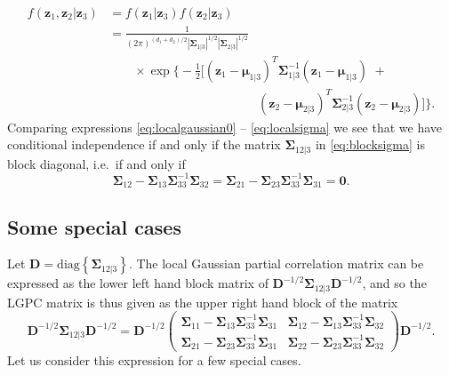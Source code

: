 \documentclass[
  12pt,
  letterpaper]{article}
\numberwithin{equation}{section}
\newcommand{\z}{\bm{z}}
\newcommand{\D}{\bm{D}}
\newcommand{\fmu}{\bm{\mu}}
\newcommand{\fSigma}{\bm{\Sigma}}
\begin{document}
\begin{align*}
f(\z_1, \z_2|\z_3) &= f(\z_1|\z_3)f(\z_2|\z_3) \\
&= \frac{1}{(2\pi)^{(d_1+d_2)/2}|\fSigma_{1|3}|^{1/2}|\fSigma_{2|3}|^{1/2}} \\
& \qquad \times \exp \Big\{-\frac{1}{2}\big[(\z_1 - \fmu_{1|3})^T\fSigma_{1|3}^{-1}(\z_1 - \fmu_{1|3}) \,\, + \\
& \qquad\qquad\qquad\qquad\qquad\qquad(\z_2 - \fmu_{2|3})^T\fSigma_{2|3}^{-1}(\z_2 - \fmu_{2|3})\big]\Big\}.
\end{align*}
Comparing expressions \eqref{eq:localgaussian0} -- \eqref{eq:localsigma} we see that we have conditional independence if and only if the matrix \(\fSigma_{12|3}\) in \eqref{eq:blocksigma} is block diagonal, i.e.~if and only if
\[\fSigma_{12} - \fSigma_{13}\fSigma_{33}^{-1} \fSigma_{32} = \fSigma_{21} - \fSigma_{23}\fSigma_{33}^{-1} \fSigma_{31} = \bm{0}.\]

\hypertarget{special-cases}{%
\subsection{Some special cases}\label{special-cases}}

Let \(\D = \textrm{diag}\left\{\fSigma_{12|3}\right\}\). The local Gaussian partial correlation matrix can be expressed as the lower left hand block matrix of \(\D^{-1/2}\fSigma_{12|3}\D^{-1/2}\), and so the LGPC matrix is thus given as the upper right hand block of the matrix
\begin{equation}
\D^{-1/2}\fSigma_{12|3}\D^{-1/2} = \D^{-1/2}\begin{pmatrix} \fSigma_{11} - \fSigma_{13}\fSigma_{33}^{-1} \fSigma_{31} & \fSigma_{12} - \fSigma_{13}\fSigma_{33}^{-1} \fSigma_{32} \\ \fSigma_{21} - \fSigma_{23}\fSigma_{33}^{-1} \fSigma_{31} & \fSigma_{22} - \fSigma_{23}\fSigma_{33}^{-1} \fSigma_{32}\end{pmatrix}\D^{-1/2}.
\label{eq:matrixdef}
\end{equation}
Let us consider this expression for a few special cases.
\end{document}
